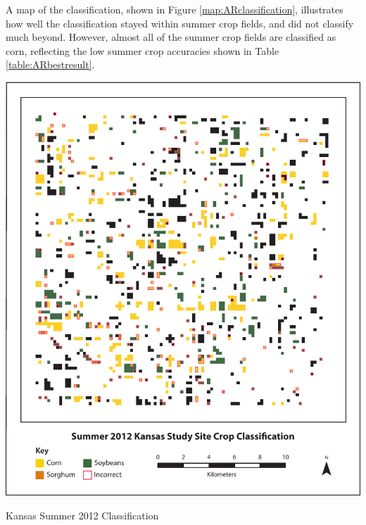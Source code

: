 A map of the classification, shown in Figure \ref{map:ARclassification}, illustrates how well the classification stayed within summer crop fields, and did not classify much beyond. However, almost all of the summer crop fields are classified as corn, reflecting the low summer crop accuracies shown in Table \ref{table:ARbestresult}.

\begin{ssfigure}
  \centering
  \includegraphics[width=\textwidth]{Graphics/KSclass.pdf}
  \caption{Kansas Summer 2012 Classification}
  \label{map:KSclassification}
\end{ssfigure}

